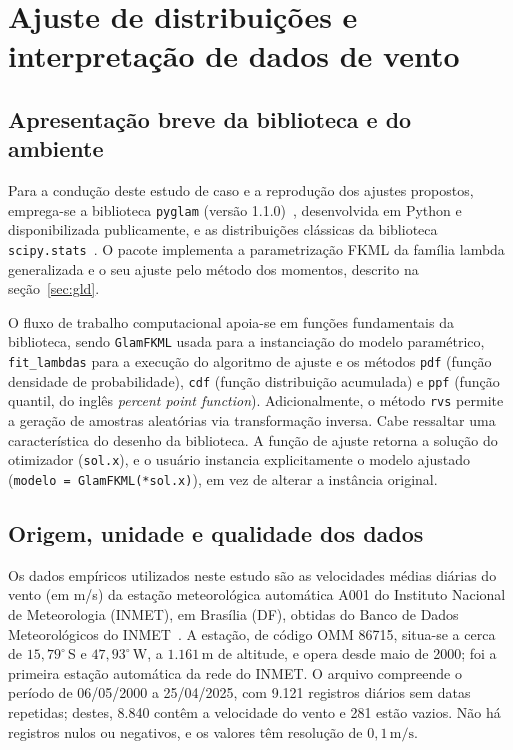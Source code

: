 \section{Ajuste de distribuições e interpretação de dados de vento}\label{sec:vento}

\subsection{Apresentação breve da biblioteca e do ambiente}

Para a condução deste estudo de caso e a reprodução dos ajustes propostos, emprega-se a biblioteca \texttt{pyglam} (versão 1.1.0)~\cite{pyglam}, desenvolvida em Python e disponibilizada publicamente, e as distribuições clássicas da biblioteca \texttt{scipy.stats}~\cite{scipy2020}. O pacote implementa a parametrização FKML da família lambda generalizada e o seu ajuste pelo método dos momentos, descrito na seção~\ref{sec:gld}.

O fluxo de trabalho computacional apoia-se em funções fundamentais da biblioteca, sendo \texttt{GlamFKML} usada para a instanciação do modelo paramétrico, \texttt{fit\_lambdas} para a execução do algoritmo de ajuste e os métodos \texttt{pdf} (função densidade de probabilidade), \texttt{cdf} (função distribuição acumulada) e \texttt{ppf} (função quantil, do inglês \textit{percent point function}). Adicionalmente, o método \texttt{rvs} permite a geração de amostras aleatórias via transformação inversa. Cabe ressaltar uma característica do desenho da biblioteca. A função de ajuste retorna a solução do otimizador (\texttt{sol.x}), e o usuário instancia explicitamente o modelo ajustado (\texttt{modelo = GlamFKML(*sol.x)}), em vez de alterar a instância original.

\subsection{Origem, unidade e qualidade dos dados}

Os dados empíricos utilizados neste estudo são as velocidades médias diárias do vento (em m/s) da estação meteorológica automática A001 do Instituto Nacional de Meteorologia (INMET), em Brasília (DF), obtidas do Banco de Dados Meteorológicos do INMET~\cite{inmet2025}. A estação, de código OMM 86715, situa-se a cerca de $15{,}79^\circ$\,S e $47{,}93^\circ$\,W, a $1.161$\,m de altitude, e opera desde maio de 2000; foi a primeira estação automática da rede do INMET. O arquivo compreende o período de 06/05/2000 a 25/04/2025, com 9.121 registros diários sem datas repetidas; destes, 8.840 contêm a velocidade do vento e 281 estão vazios. Não há registros nulos ou negativos, e os valores têm resolução de $0,1\,\text{m/s}$.


